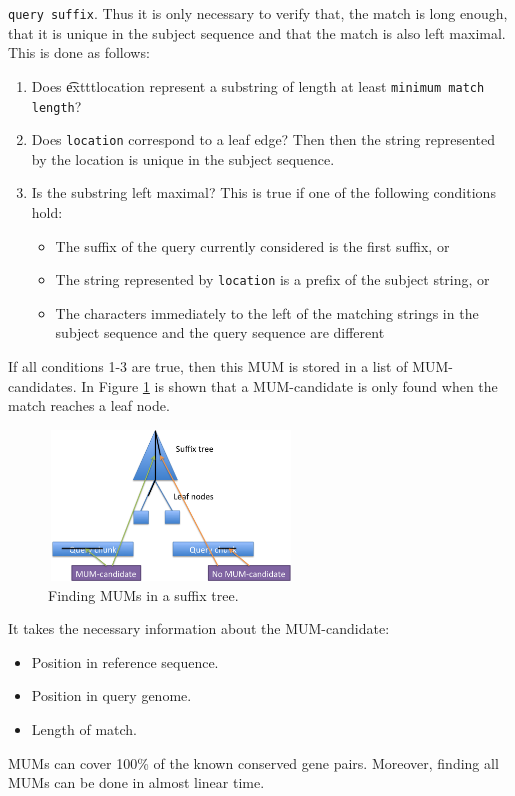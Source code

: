 \documentclass[3p,times]{elsarticle}
\begin{document}
  \texttt{query suffix}. Thus it is only necessary to verify that, the match is long enough, that it is unique in the subject sequence and that 
  the match is also left maximal. This is done as follows:
    \begin{enumerate}
  \item
  Does \t exttt{location} represent a substring of length at least \texttt{minimum match length}?
   \item 
  Does \texttt{location} correspond to a leaf edge? Then then the string represented by the location is unique in the subject sequence.
  \item  
  Is the substring left maximal? This is true if one of the following conditions hold:
  \begin{itemize}
  \item  
  The suffix of the query currently considered is the first suffix, or 
  \item
  The string represented by \texttt{location} is a prefix of the subject string,  or
  \item 
  The characters immediately to the left of the matching strings in the subject sequence and the query sequence are different
  \end{itemize}
  \end{enumerate}
  If all conditions 1-3 are true, then this MUM is stored in a list of MUM-candidates. In Figure \ref{candidates} is shown that a MUM-candidate is only found when the match reaches a leaf node. 
 \begin{figure}[htb]  
 \begin{center} 
  \includegraphics[width=6.5cm,height=4cm]{MUM-candidates.png}
 \end{center} 
 \caption{Finding MUMs in a suffix tree.} 
 \label{candidates} 
 \end{figure}  
  It takes the necessary information about the MUM-candidate:
  \begin{itemize}
    \item Position in reference sequence.
    \item Position in query genome.
    \item Length of match.
  \end{itemize}
MUMs can cover 100\% of the known  conserved gene pairs. Moreover, finding all MUMs  can be done in almost linear time.
\end{document}
